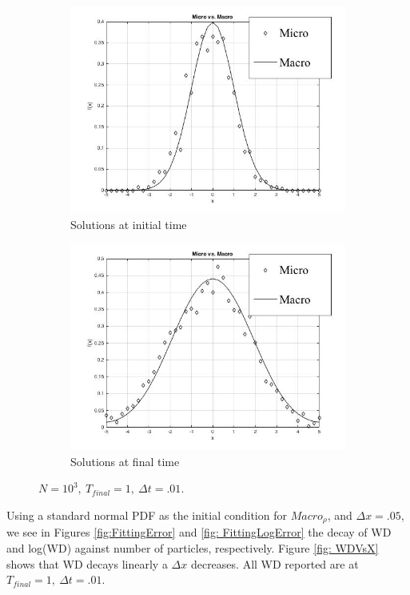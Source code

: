 \documentclass[10pt]{article}
\begin{document}
\begin{figure}[H]
\centering
\begin{subfigure}{.5\textwidth}
  \centering
  \includegraphics[width=.9\linewidth]{InitialDistributions.jpg}
  \caption{Solutions at initial time}
  \label{fig: rhoInitial}
\end{subfigure}%
\begin{subfigure}{.5\textwidth}
  \centering
  \includegraphics[width=.9\linewidth]{FinalDistribution.jpg}
  \caption{Solutions at final time}
  \label{fig: rhoFinal}
\end{subfigure}
\caption{$N = 10^3, \ T_{final} = 1, \ \Delta t =.01.$}
\label{fig:test}
\end{figure}

\noindent Using a standard normal PDF as the initial condition for $Macro_{\rho}$, and $\Delta x = .05$, we see in Figures \ref{fig:FittingError} and \ref{fig: FittingLogError} the decay of WD and log(WD) against number of particles, respectively. Figure \ref{fig: WDVsX} shows that WD decays linearly a $\Delta x$ decreases.  All WD reported are at $T_{final} = 1, \ \Delta t = .01.$
\end{document}
